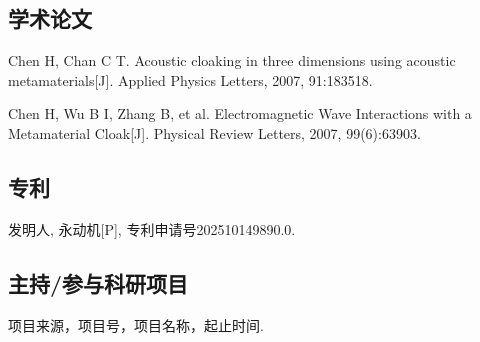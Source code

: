 
\begin{resume}

\subsection*{学术论文}

\begin{achievements}
	\item Chen H, Chan C T. Acoustic cloaking in three dimensions using acoustic metamaterials[J]. Applied Physics Letters, 2007, 91:183518.
	\item Chen H, Wu B I, Zhang B, et al. Electromagnetic Wave Interactions with a Metamaterial Cloak[J]. Physical Review Letters, 2007, 99(6):63903.
\end{achievements}

\subsection*{专利}

\begin{achievements}
	\item 发明人, 永动机[P], 专利申请号202510149890.0.
\end{achievements}

\subsection*{主持/参与科研项目}

\begin{achievements}
	\item 项目来源，项目号，项目名称，起止时间.
\end{achievements}

\end{resume}
